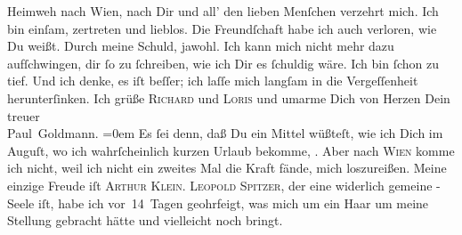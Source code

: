 \begin{ledgroupsized}[t]{13cm}
               Heimweh nach Wien, nach Dir und all’ {\pb}den lieben Menſchen verzehrt mich. Ich bin einſam,
               zertreten und lieblos. Die Freundſchaft habe ich auch verloren, wie Du weißt. Durch
               meine Schuld, jawohl. Ich kann mich nicht mehr dazu aufſchwingen, dir ſo zu
               ſchreiben, wie ich Dir es ſchuldig wäre. Ich bin ſchon zu tief. Und ich denke, es iſt
               beſſer; ich laſſe mich langſam in die Vergeſſenheit herunterſinken.\pend
           \pstart
           Ich grüße \textsc{Richard} und \textsc{Loris} und
               umarme Dich von Herzen\pend
           \pstart
           Dein {\\[\baselineskip]}treuer {\\[\baselineskip]}\spacefill\mbox{Paul Goldmann.}\pend
           \leftskip=0em{}\pstart
           \noindent{}{\pb}Es ſei denn, daß Du ein Mittel wüßteſt, wie ich
                  Dich im Auguſt, wo ich wahrſcheinlich kurzen Urlaub
                  bekomme, \label{K_L02698-4v}\label{K_L02698-4h}. Aber nach \textsc{Wien} komme ich nicht, weil ich nicht ein zweites Mal die Kraft fände, mich
                  loszureißen.\pend
           \pstart
           Meine einzige Freude iſt \textsc{Arthur Klein}. \textsc{Leopold Spitzer}, der eine widerlich gemeine \label{K_L02698-5v}\label{K_L02698-5h}-Seele iſt, habe ich
                  vor 14 Tagen geohrfeigt, was mich um ein Haar um meine Stellung gebracht hätte und
                  vielleicht noch bringt.\pend
                     \endnumbering{}\end{ledgroupsized}  \newcommand{\dateiname}{L02698}\newcommand{\titel}{Paul Goldmann an Arthur Schnitzler, 24. 6. [1892]}\newcommand{\editorInnen}{Martin Anton Müller und Laura Untner}
            \footnotesize
\begin{ledgroupsized}[t]{11.5cm}
\end{ledgroupsized}
         
      